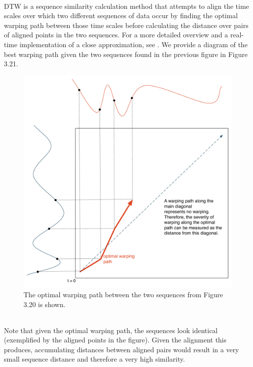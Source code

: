 \documentclass[a4paper,12pt]{report} 	%
\numberwithin{figure}{chapter}
\numberwithin{table}{chapter}
\numberwithin{equation}{chapter}
\begin{document}
\begin{flushleft}
\begin{figure}[h!]
\begin{center}
\end{center}
\end{figure}
\\
DTW is a sequence similarity calculation method that attempts to align the time scales over which two different sequences of data occur by finding the optimal warping path between those time scales before calculating the distance over pairs of aligned points in the two sequences. For a more detailed overview and a real-time implementation of a close approximation, see \cite{Salvador:2004et}. We provide a diagram of the best warping path given the two sequences found in the previous figure in Figure 3.21. 
\begin{figure}[h!]
\begin{center}
\includegraphics[scale=0.5]{DTWExample}
\caption[Timbre Distance Between Time-Warped Curves]{The optimal warping path between the two sequences from Figure 3.20 is shown.}
\end{center}
\end{figure}
\\
Note that given the optimal warping path, the sequences look identical (exemplified by the aligned points in the figure). Given the alignment this produces, accumulating distances between aligned pairs would result in a very small sequence distance and therefore a very high similarity.


\end{flushleft}
\end{document}
